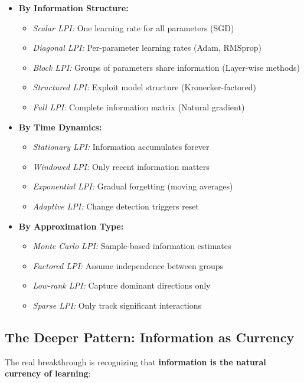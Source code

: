 \documentclass[11pt]{article}
\begin{document}
\begin{itemize}
\item \textbf{By Information Structure:}
  \begin{itemize}
  \item \textit{Scalar LPI:} One learning rate for all parameters (SGD)
  \item \textit{Diagonal LPI:} Per-parameter learning rates (Adam, RMSprop)
  \item \textit{Block LPI:} Groups of parameters share information (Layer-wise methods)
  \item \textit{Structured LPI:} Exploit model structure (Kronecker-factored)
  \item \textit{Full LPI:} Complete information matrix (Natural gradient)
  \end{itemize}
  
\item \textbf{By Time Dynamics:}
  \begin{itemize}
  \item \textit{Stationary LPI:} Information accumulates forever
  \item \textit{Windowed LPI:} Only recent information matters
  \item \textit{Exponential LPI:} Gradual forgetting (moving averages)
  \item \textit{Adaptive LPI:} Change detection triggers reset
  \end{itemize}
  
\item \textbf{By Approximation Type:}
  \begin{itemize}
  \item \textit{Monte Carlo LPI:} Sample-based information estimates
  \item \textit{Factored LPI:} Assume independence between groups
  \item \textit{Low-rank LPI:} Capture dominant directions only
  \item \textit{Sparse LPI:} Only track significant interactions
  \end{itemize}
\end{itemize}

\subsection{The Deeper Pattern: Information as Currency}

The real breakthrough is recognizing that \textbf{information is the natural currency of learning}:
\end{document}
